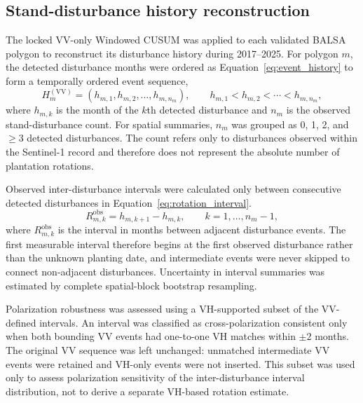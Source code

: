 \subsection{Stand-disturbance history reconstruction}
\label{sec:rotation_reconstruction}

The locked VV-only Windowed CUSUM was applied to each validated BALSA polygon to reconstruct its disturbance history during 2017--2025. For polygon $m$, the detected disturbance months were ordered as Equation~\eqref{eq:event_history} to form a temporally ordered event sequence,
\begin{equation}
    H_m^{(\mathrm{VV})}
    =
    (h_{m,1},h_{m,2},\ldots,h_{m,n_m}),
    \qquad
    h_{m,1}<h_{m,2}<\cdots<h_{m,n_m},
    \label{eq:event_history}
\end{equation}
where $h_{m,k}$ is the month of the $k$th detected disturbance and
$n_m$ is the observed stand-disturbance count. For spatial summaries,
$n_m$ was grouped as 0, 1, 2, and $\geq3$ detected disturbances.
The count refers only to disturbances observed within the Sentinel-1
record and therefore does not represent the absolute number of
plantation rotations.

Observed inter-disturbance intervals were calculated only between
consecutive detected disturbances in Equation~\eqref{eq:rotation_interval}.
\begin{equation}
    R_{m,k}^{\mathrm{obs}}
    =
    h_{m,k+1}-h_{m,k},
    \qquad
    k=1,\ldots,n_m-1,
    \label{eq:rotation_interval}
\end{equation}
where $R_{m,k}^{\mathrm{obs}}$ is the interval in months between adjacent
disturbance events. The first measurable interval therefore begins at
the first observed disturbance rather than the unknown planting date,
and intermediate events were never skipped to connect non-adjacent
disturbances. Uncertainty in interval summaries was estimated by
complete spatial-block bootstrap resampling.

Polarization robustness was assessed using a VH-supported subset of the
VV-defined intervals. An interval was classified as cross-polarization
consistent only when both bounding VV events had one-to-one VH matches
within $\pm2$ months. The original VV sequence was left unchanged:
unmatched intermediate VV events were retained and VH-only events were
not inserted. This subset was used only to assess polarization
sensitivity of the inter-disturbance interval distribution, not to
derive a separate VH-based rotation estimate.





